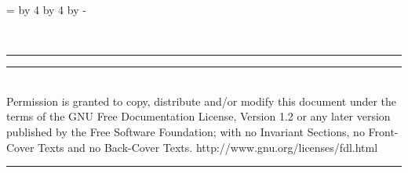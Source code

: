 \documentclass[8pt,pagesize,twoside,footexclude,headexclude]{scrartcl}
\begin{document}
\clearpage
\pagestyle{empty}
\newcount\currentpage 
\currentpage=\value{page} 
\divide\currentpage by 4  
\multiply\currentpage by 4  
\advance\currentpage by -\value{page}
%
\begin{titlepage}
  \begin{center}
    \renewcommand{\rmdefault}{ptm} %
    \vspace*{15mm}
    \vfill
    \begin{minipage}{\titlepagewidth}
      \begin{center}
        \rmfamily\mdseries\itshape\fontsize{300}{0}\selectfont
        \\
      \end{center}
    \end{minipage}
    \vfill
    \rule{1.75cm}{0pt}
    \vfill
    \begin{minipage}{\titlepagewidth}
      \hrule
      \vspace{1.5mm}
      \rmfamily\small
      \\[1.5mm] 
      Permission is granted to copy, distribute and/or modify this
      document under the terms of the GNU Free Documentation License,
      Version 1.2 or any later version published by the Free Software
      Foundation; with no Invariant Sections, no Front-Cover Texts and
      no Back-Cover Texts.\hfill
      http://www.gnu.org/licenses/fdl.html\\
      \vspace{-1mm}
      \hrule
    \end{minipage}
  \end{center}
\end{titlepage}
\end{document}
